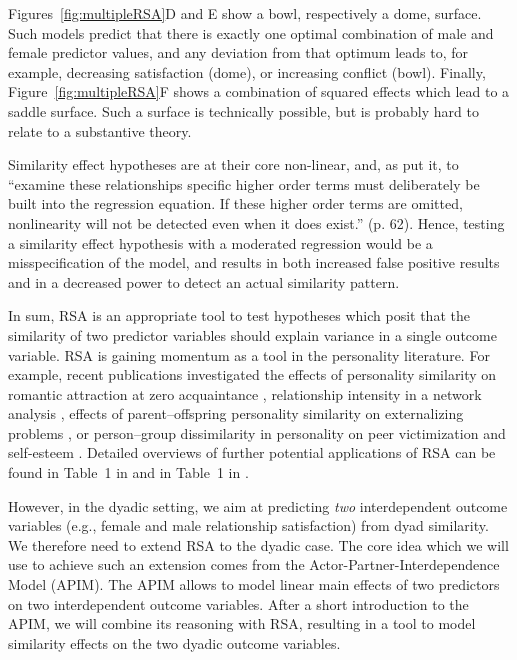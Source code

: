 \documentclass[jou,a4paper,draftfirst]{apa6}
\newcommand{\added}[1]{#1}
\begin{document}
\added{Figures~\ref{fig:multipleRSA}D and E show a bowl, respectively a dome, surface. Such models predict that there is exactly one optimal combination of male and female predictor values, and any deviation from that optimum leads to, for example, decreasing satisfaction (dome), or increasing conflict (bowl).
Finally, Figure~\ref{fig:multipleRSA}F shows a combination of squared effects which lead to a saddle surface. Such a surface is technically possible, but is probably hard to relate to a substantive theory.}



\added{Similarity effect hypotheses are at their core non-linear, and, as \textcite{Aiken_West_1991} put it, to ``examine these relationships specific higher order terms must deliberately be built into the regression equation. If these higher order terms are omitted, nonlinearity will not be detected even when it does exist.'' (p. 62). Hence, testing a similarity effect hypothesis with a moderated regression would be a misspecification of the model, and results in both increased false positive results and in a decreased power to detect an actual similarity pattern.}


In sum, RSA is an appropriate tool to test hypotheses which posit that the similarity of two predictor variables should explain variance in a single outcome variable.
RSA is gaining momentum as a tool in the personality literature. For example, recent publications investigated the effects of personality similarity on romantic attraction at zero acquaintance \parencite{olderbak_predicting_2017}, relationship intensity in a network analysis \parencite{ilmarinen_homophilous_2017}, effects of parent–offspring personality similarity on externalizing problems \parencite{franken_using_2017}, or person–group dissimilarity in personality on peer victimization \parencite{boele_persongroup_2017} and self-esteem \parencite{Bleidorn_2016}. Detailed overviews of further potential applications of RSA can be found in Table~1 in \textcite{Barranti__2017} and in Table~1 in \textcite{HumbergRSA}.

However, in the dyadic setting, we aim at predicting \emph{two} interdependent outcome variables (e.g., female and male relationship satisfaction) from dyad similarity. We therefore need to extend RSA to the dyadic case. The core idea which we will use to achieve such an extension comes from the Actor-Partner-Interdependence Model (APIM). The APIM allows to model linear main effects of two predictors on two interdependent outcome variables. After a short introduction to the APIM, we will combine its reasoning with RSA, resulting in a tool to model similarity effects on the two dyadic outcome variables.
\end{document}
